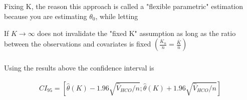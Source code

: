 \documentclass[12pt]{article}
\begin{document}
\subsection{}
\subsubsection{}
Fixing K, the reason this approach is called a "flexible parametric" estimation because you are estimating $\theta_0$, while letting

If $K\rightarrow\infty$ does not invalidate the "fixed K" assumption as long as the ratio between the observations and covariates is fixed $\left( \frac{K_n}{n} = \frac{\bar{K}}{\bar{n}}   \right)$

\subsubsection{}
Using the results above the confidence interval is

\begin{gather*}
CI_{95} = \left[\hat{\theta}(K)  - 1.96  \sqrt{\hat{V}_{HCO} / n}  ; \hat{\theta}(K) + 1.96  \sqrt{\hat{V}_{HCO} / n} \right]
\end{gather*}

\subsection{}
\end{document}
